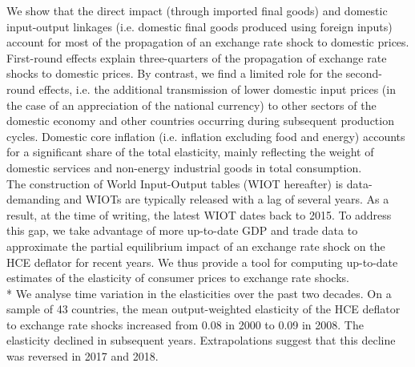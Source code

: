 \documentclass[12pt,a4paper]{article}
\begin{document}
We show that the direct impact (through imported final goods) and domestic input-output linkages (i.e. domestic final goods produced using foreign inputs) account for most of the propagation of an exchange rate shock to domestic prices. First-round effects explain three-quarters of the propagation of exchange rate shocks to domestic prices. By contrast, we find a limited role for the second-round effects, i.e. the additional transmission of lower domestic input prices (in the case of an appreciation of the national currency) to other sectors of the domestic economy and other countries occurring during subsequent production cycles. Domestic core inflation (i.e. inflation excluding food and energy) accounts for a significant share of the total elasticity, mainly reflecting the weight of domestic services and non-energy industrial goods in total consumption. \\
The construction of World Input-Output tables (WIOT hereafter) is data-demanding and WIOTs are typically released with a lag of several years. As a result, at the time of writing, the latest WIOT dates back to 2015. To address this gap, we take advantage of more up-to-date GDP and trade data to approximate the partial equilibrium impact of an exchange rate shock on the HCE deflator for recent years. We thus provide a tool for computing up-to-date estimates of the elasticity of consumer prices to exchange rate shocks.\\*
We analyse time variation in the elasticities over the past two decades. On a sample of 43 countries, the mean output-weighted elasticity of the HCE deflator to exchange rate shocks increased from 0.08 in 2000 to 0.09 in 2008. The elasticity declined in subsequent years. Extrapolations suggest that this decline was reversed in 2017 and 2018. 
\end{document}
